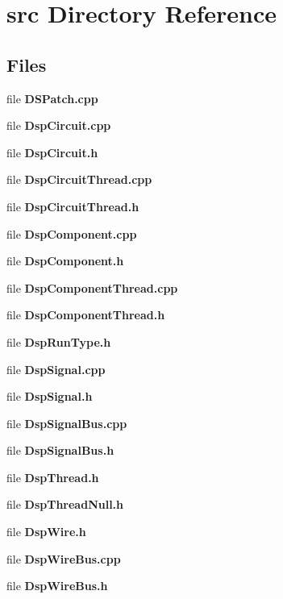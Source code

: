 \section{src Directory Reference}
\label{dir_68267d1309a1af8e8297ef4c3efbcdba}
\subsection*{Files}
\begin{DoxyCompactItemize}
\item 
file {\bfseries D\-S\-Patch.\-cpp}
\item 
file {\bfseries Dsp\-Circuit.\-cpp}
\item 
file {\bfseries Dsp\-Circuit.\-h}
\item 
file {\bfseries Dsp\-Circuit\-Thread.\-cpp}
\item 
file {\bfseries Dsp\-Circuit\-Thread.\-h}
\item 
file {\bfseries Dsp\-Component.\-cpp}
\item 
file {\bfseries Dsp\-Component.\-h}
\item 
file {\bfseries Dsp\-Component\-Thread.\-cpp}
\item 
file {\bfseries Dsp\-Component\-Thread.\-h}
\item 
file {\bfseries Dsp\-Run\-Type.\-h}
\item 
file {\bfseries Dsp\-Signal.\-cpp}
\item 
file {\bfseries Dsp\-Signal.\-h}
\item 
file {\bfseries Dsp\-Signal\-Bus.\-cpp}
\item 
file {\bfseries Dsp\-Signal\-Bus.\-h}
\item 
file {\bfseries Dsp\-Thread.\-h}
\item 
file {\bfseries Dsp\-Thread\-Null.\-h}
\item 
file {\bfseries Dsp\-Wire.\-h}
\item 
file {\bfseries Dsp\-Wire\-Bus.\-cpp}
\item 
file {\bfseries Dsp\-Wire\-Bus.\-h}
\end{DoxyCompactItemize}
